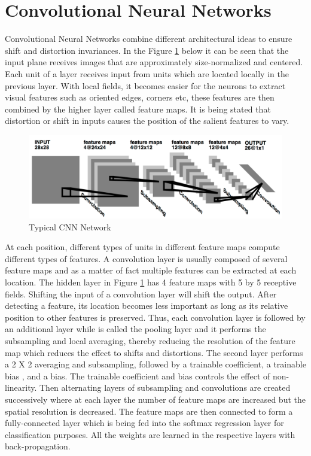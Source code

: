 \section{Convolutional Neural Networks} \label{sec:build5}

Convolutional Neural Networks \cite{cnn} combine different architectural ideas to ensure  shift and distortion invariances. In the Figure \ref{fig:Figure19} below it  can be seen that the input plane receives images that are approximately size-normalized and centered. Each unit of a layer receives input from units which are located locally in the previous layer. With local fields, it becomes easier for the neurons to extract visual features such as oriented edges, corners etc, these features are then combined by the higher layer called feature maps. It is being stated that distortion or shift in inputs causes the position of the salient features to vary. 

\begin{figure}[t]
	\begin{center}
		\includegraphics[width=\textwidth]{Figures/Figure19}
	\end{center}
	\caption{Typical CNN Network\cite{lecun}}
	\label{fig:Figure19}
\end{figure}


At each position, different types of units in different feature maps compute different types of features. A convolution layer is usually composed of several feature maps and as a matter of fact multiple features can be extracted at each location. The hidden layer in Figure \ref{fig:Figure19} has 4 feature maps with 5 by 5 receptive fields. Shifting the input of a convolution layer will shift the output. After detecting a feature, its location becomes less important as long as its relative position to other features is preserved. Thus, each convolution layer is followed by an additional layer while is called the pooling layer and it performs the subsampling and local averaging, thereby reducing the resolution of the feature map which reduces the effect to shifts and distortions. The second layer performs a 2 X 2 averaging and subsampling, followed by a trainable coefficient, a trainable bias , and a bias. The trainable coefficient and bias controls the effect of non-linearity. Then alternating layers of subsampling and convolutions are created successively where at each layer the number of feature maps are increased but the spatial resolution is decreased. The feature maps are then connected to form a fully-connected layer which is being fed into the softmax regression layer for classification purposes. All the weights are learned in the respective layers with back-propagation.

